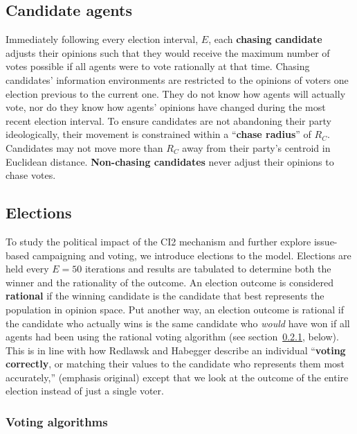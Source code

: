\subsection{Candidate agents}

Immediately following every election interval, $E$, each \textbf{chasing candidate} adjusts
their opinions such that they would receive the maximum number of votes
possible if all agents were to vote rationally at that time. Chasing
candidates' information environments are restricted to the opinions of voters
one election previous to the current one. They do not know how agents will
actually vote, nor do they know how agents' opinions have changed during the
most recent election interval. To ensure candidates are not abandoning their
party ideologically, their movement is constrained within a ``\textbf{chase
radius}'' of $R_C$. Candidates may not move more than $R_C$ away from their party's centroid in Euclidean distance. \textbf{Non-chasing
candidates} never adjust their opinions to chase votes.


\subsection{Elections}

To study the political impact of the CI2 mechanism and further explore
issue-based campaigning and voting, we introduce elections to the model.
Elections are held every $E=50$ iterations and results are tabulated to
determine both the winner and the rationality of the outcome. An election
outcome is considered \textbf{rational} if the winning candidate is the
candidate that best represents the population in opinion space. Put another
way, an election outcome is rational if the candidate who actually wins is the
same candidate who \textit{would} have won if all agents had been using the
rational voting algorithm (see section~\ref{votingAlgorithms}, below). This is
in line with how Redlawsk and Habegger describe an individual ``\textbf{voting
correctly}, or matching their values to the candidate who represents them most
accurately,''\cite[p.8]{redlawsk_citizens_2020} (emphasis original) except that
we look at the outcome of the entire election instead of just a single voter.

\subsubsection{Voting algorithms}
\label{votingAlgorithms}


